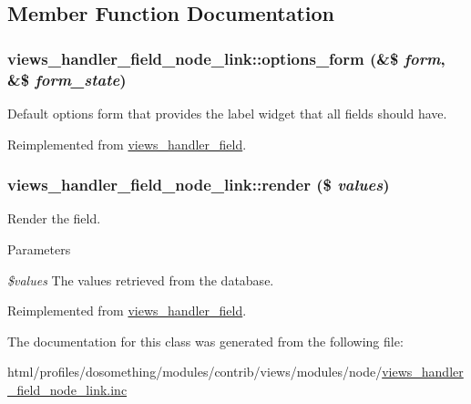 \subsection{Member Function Documentation}
\hypertarget{classviews__handler__field__node__link_afe6559cbf0b01700ae56fa62c5ca7616}{
\subsubsection[{options\_\-form}]{\setlength{\rightskip}{0pt plus 5cm}views\_\-handler\_\-field\_\-node\_\-link::options\_\-form (\&\$ {\em form}, \/  \&\$ {\em form\_\-state})}}
\label{classviews__handler__field__node__link_afe6559cbf0b01700ae56fa62c5ca7616}
Default options form that provides the label widget that all fields should have. 

Reimplemented from \hyperlink{classviews__handler__field_a0435d161922b7b4b84f02a2e79bb947a}{views\_\-handler\_\-field}.\hypertarget{classviews__handler__field__node__link_a9621ff38a6b318eb94f0c44fa2f711f5}{
\subsubsection[{render}]{\setlength{\rightskip}{0pt plus 5cm}views\_\-handler\_\-field\_\-node\_\-link::render (\$ {\em values})}}
\label{classviews__handler__field__node__link_a9621ff38a6b318eb94f0c44fa2f711f5}
Render the field.


\begin{DoxyParams}{Parameters}
\item[{\em \$values}]The values retrieved from the database. \end{DoxyParams}


Reimplemented from \hyperlink{classviews__handler__field_a82ff951c5e9ceb97b2eab86f880cbc1e}{views\_\-handler\_\-field}.

The documentation for this class was generated from the following file:\begin{DoxyCompactItemize}
\item 
html/profiles/dosomething/modules/contrib/views/modules/node/\hyperlink{views__handler__field__node__link_8inc}{views\_\-handler\_\-field\_\-node\_\-link.inc}\end{DoxyCompactItemize}
